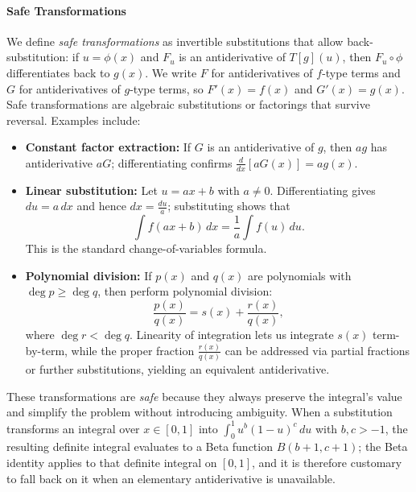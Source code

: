\paragraph{Safe Transformations}

We define \emph{safe transformations} as invertible substitutions that allow back-substitution: if \(u=\phi(x)\) and \(F_u\) is an antiderivative of \(T[g](u)\), then \(F_u\!\circ\!\phi\) differentiates back to \(g(x)\). We write \(F\) for antiderivatives of \(f\)-type terms and \(G\) for antiderivatives of \(g\)-type terms, so \(F'(x)=f(x)\) and \(G'(x)=g(x)\). Safe transformations are algebraic substitutions or factorings that survive reversal. Examples include:

\begin{itemize}
  \item \textbf{Constant factor extraction:} If \(G\) is an antiderivative of \(g\), then \(a g\) has antiderivative \(a G\); differentiating confirms \(\frac{d}{dx}[a G(x)] = a g(x)\).
  \item \textbf{Linear substitution:} Let \(u = ax + b\) with \(a \neq 0\). Differentiating gives \(du = a\, dx\) and hence \(dx = \frac{du}{a}\); substituting shows that
  \begin{equation}
    \int f(ax + b)\, dx = \frac{1}{a} \int f(u)\, du.
    \label{eq:linear_change_of_variables}
  \end{equation}
  This is the standard change-of-variables formula.
  \item \textbf{Polynomial division:} If \( p(x) \) and \( q(x) \) are polynomials with \(\deg p \geq \deg q\), then perform polynomial division:
  \[
  \frac{p(x)}{q(x)} = s(x) + \frac{r(x)}{q(x)},
  \]
  where \(\deg r < \deg q\). Linearity of integration lets us integrate \(s(x)\) term-by-term, while the proper fraction \(\frac{r(x)}{q(x)}\) can be addressed via partial fractions or further substitutions, yielding an equivalent antiderivative.
\end{itemize}

These transformations are \emph{safe} because they always preserve the integral's value and simplify the problem without introducing ambiguity. When a substitution transforms an integral over \(x \in [0,1]\) into \(\int_0^1 u^{b}(1-u)^{c}\, du\) with \(b, c > -1\), the resulting definite integral evaluates to a Beta function \(B(b+1, c+1)\); the Beta identity applies to that definite integral on \([0,1]\), and it is therefore customary to fall back on it when an elementary antiderivative is unavailable.

